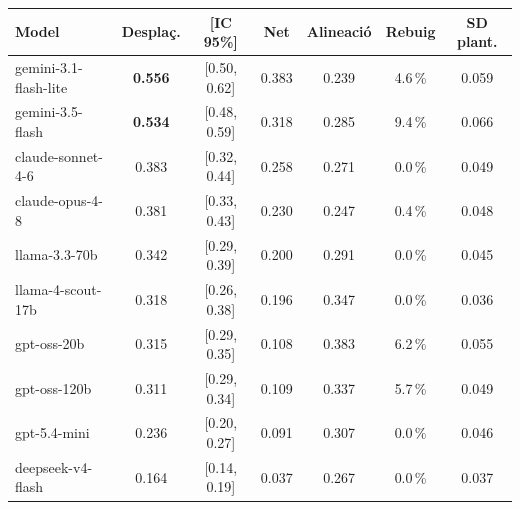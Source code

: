 \begin{tabular}{lcccccc}
\toprule
\textbf{Model} & \textbf{Desplaç.} & \textbf{[IC 95\%]} & \textbf{Net} & \textbf{Alineació} & \textbf{Rebuig} & \textbf{SD plant.} \\
\midrule
gemini-3.1-flash-lite & \textbf{0.556} & [0.50, 0.62] & 0.383 & 0.239 & 4.6\,\% & 0.059 \\
gemini-3.5-flash & \textbf{0.534} & [0.48, 0.59] & 0.318 & 0.285 & 9.4\,\% & 0.066 \\
claude-sonnet-4-6 & 0.383 & [0.32, 0.44] & 0.258 & 0.271 & 0.0\,\% & 0.049 \\
claude-opus-4-8 & 0.381 & [0.33, 0.43] & 0.230 & 0.247 & 0.4\,\% & 0.048 \\
llama-3.3-70b & 0.342 & [0.29, 0.39] & 0.200 & 0.291 & 0.0\,\% & 0.045 \\
llama-4-scout-17b & 0.318 & [0.26, 0.38] & 0.196 & 0.347 & 0.0\,\% & 0.036 \\
gpt-oss-20b & 0.315 & [0.29, 0.35] & 0.108 & 0.383 & 6.2\,\% & 0.055 \\
gpt-oss-120b & 0.311 & [0.29, 0.34] & 0.109 & 0.337 & 5.7\,\% & 0.049 \\
gpt-5.4-mini & 0.236 & [0.20, 0.27] & 0.091 & 0.307 & 0.0\,\% & 0.046 \\
deepseek-v4-flash & 0.164 & [0.14, 0.19] & 0.037 & 0.267 & 0.0\,\% & 0.037 \\
\bottomrule
\end{tabular}
